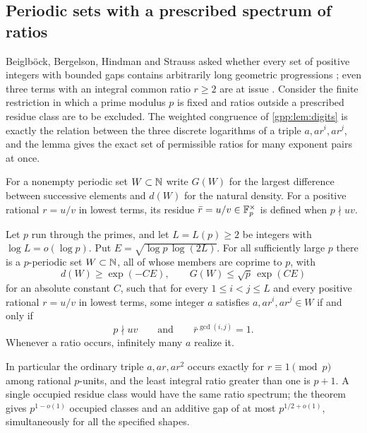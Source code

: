 \subsection{Periodic sets with a prescribed spectrum of ratios}\label{gpp:sec:syndetic}
{\raggedright{}}

Beiglb\"ock, Bergelson, Hindman and Strauss asked whether every set of positive integers
with bounded gaps contains arbitrarily long geometric progressions
\cite{Beiglbock2006Multiplicative}; even three terms with an integral common ratio
$r\ge2$ are at issue \cite{Nathanson2020Geometric}. Consider the finite restriction in
which a prime modulus $p$ is fixed and ratios outside a prescribed residue class are to
be excluded. The weighted congruence of \cref{gpp:lem:digits} is exactly the relation
between the three discrete logarithms of a triple $a,ar^i,ar^j$, and the lemma gives the
exact set of permissible ratios for many exponent pairs at once.

For a nonempty periodic set $W\subset\mathbb{N}$ write $G(W)$ for the largest difference between
successive elements and $d(W)$ for the natural density. For a positive rational $r=u/v$
in lowest terms, its residue $\bar r=u/v\in\mathbb{F}_p^\times$ is defined when $p\nmid uv$.

\begin{theorem}\label{gpp:thm:syndetic}
Let $p$ run through the primes, and let $L=L(p)\ge2$ be integers with
$\log L=o(\log p)$. Put $E=\sqrt{\log p\,\log(2L)}$. For all sufficiently large $p$
there is a $p$-periodic set $W\subset\mathbb{N}$, all of whose members are coprime to $p$, with
\[
 d(W)\ge\exp(-CE),\qquad G(W)\le\sqrt p\,\exp(CE)
\]
for an absolute constant $C$, such that for every $1\le i<j\le L$ and every positive
rational $r=u/v$ in lowest terms, some integer $a$ satisfies $a,ar^i,ar^j\in W$ if and
only if
\[
 p\nmid uv\qquad\text{and}\qquad\bar r^{\gcd(i,j)}=1 .
\]
Whenever a ratio occurs, infinitely many $a$ realize it.
\end{theorem}

In particular the ordinary triple $a,ar,ar^2$ occurs exactly for $r\equiv1\pmod p$ among
rational $p$-units, and the least integral ratio greater than one is $p+1$. A single
occupied residue class would have the same ratio spectrum; the theorem gives
$p^{1-o(1)}$ occupied classes and an additive gap of at most $p^{1/2+o(1)}$,
simultaneously for all the specified shapes.


